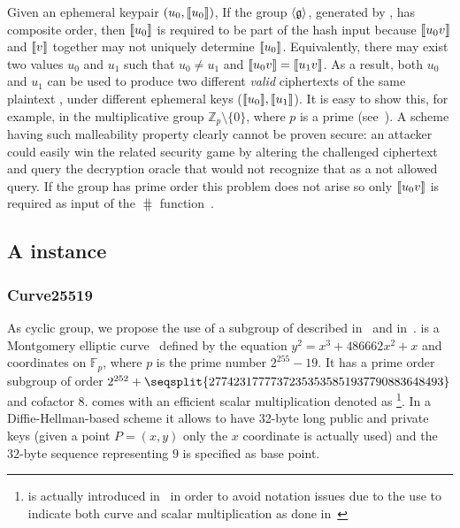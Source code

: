 Given an ephemeral keypair $(u_0, \llbracket {u_0} \rrbracket)$, If the group $\langle \mathfrak{g} \rangle$, generated by \groupSetup{}, has composite order, then $\llbracket {u_0} \rrbracket$ is required to be part of the hash input because $\llbracket {u_0 v} \rrbracket$ and $\llbracket {v} \rrbracket$ together may not uniquely determine $\llbracket {u_0} \rrbracket$. Equivalently, there may exist two values $u_0$ and $u_1$ such that $u_0 \neq u_1$ and $\llbracket {u_0 v} \rrbracket = \llbracket {u_1 v} \rrbracket$. As a result, both $u_0$ and $u_1$ can be used to produce two different \emph{valid} ciphertexts of the same plaintext \msg, under different ephemeral keys ($\llbracket {u_0} \rrbracket, \llbracket {u_1} \rrbracket$). It is easy to show this, for example, in the multiplicative group $\mathbb{Z}_p \setminus \{0\}$, where $p$ is a prime (see~\cite[Section 3.1]{abdalla1999dhaes}). A scheme having such malleability property clearly cannot be proven \indccaii{} secure: an attacker could easily win the related security game by altering the challenged ciphertext and query the decryption oracle that would not recognize that as a not allowed query. If the group has prime order this problem does not arise so only $\llbracket {u_0v} \rrbracket$ is required as input of the $\hash$ function~\cite[Section 3]{abdalla2001dhies}.

\subsection{A \dhaes{} instance}\label{instantiation:enc:algos}

\subsubsection{Curve25519}\label{instantiation:enc:algos:curve25519}

As cyclic group, we propose the use of a subgroup of  described in~\cite{bernstein2006curve25519} and in~\cite{rfc7748}.  is a Montgomery elliptic curve~\cite{montgomery1987speeding} defined by the equation $y^2 = x^3 + 486662x^2 + x$ and coordinates on $\mathbb{F}_p$, where $p$ is the prime number $2^{255}-19$. It has a prime order subgroup of order $2^{252} + \seqsplit{27742317777372353535851937790883648493}$ and cofactor $8$.
 comes with an efficient scalar multiplication denoted as \footnote{ is actually introduced in~\cite{rfc7748} in order to avoid notation issues due to the use  to indicate both curve and scalar multiplication as done in~\cite{bernstein2006curve25519}}. In a Diffie-Hellman-based scheme it allows to have 32-byte long public and private keys (given a point $P = (x,y)$ only the $x$ coordinate is actually used) and the $32$-byte sequence representing $9$ is specified as base point.

